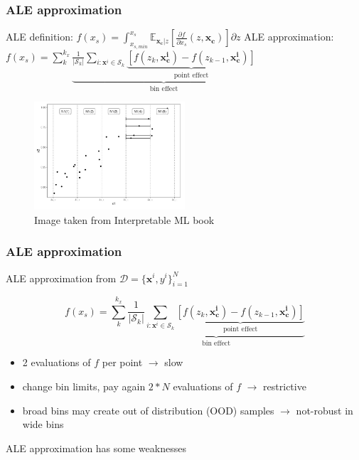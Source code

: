 \documentclass{beamer}
\newcommand{\xb}{\boldsymbol{x}}
\begin{document}
\begin{frame}
  \frametitle{ALE approximation}
  ALE definition: \( f(x_s) = \int_{x_{s, min}}^{x_s}\mathbb{E}_{\bm{x_c}|z}[ \frac{\partial f}{\partial x_s}(z, \bm{x_c})] \partial z \)
  \noindent\makebox[\linewidth]{\rule{\paperwidth}{0.4pt}}
  ALE approximation:
  \(f(x_s) = \sum_k^{k_x} \underbrace{\frac{1}{|\mathcal{S}_k|} \sum_{i:\xb^i \in \mathcal{S}_k} \underbrace{[f(z_k, \bm{x^i_c}) - f(z_{k-1}, \bm{x^i_c})]}_{\text{point effect}}}_{\text{bin effect}}\)

  \begin{figure}[ht]
    \centering
    \includegraphics[width=0.5\textwidth]{./figures/ale_bins_iml.png}
    \caption{Image taken from Interpretable ML book~\citep{molnar2022}}
  \end{figure}
\end{frame}


\begin{frame}
  \frametitle{ALE approximation}
  ALE approximation from \(\mathcal{D} = { \{\bm{x}^i, y^i}\}_{i=1}^N\)

    \[f(x_s) = \sum_k^{k_x} \underbrace{\frac{1}{|\mathcal{S}_k|} \sum_{i:\xb^i \in \mathcal{S}_k} \underbrace{[f(z_k, \bm{x^i_c}) - f(z_{k-1}, \bm{x^i_c})]}_{\text{point effect}}}_{\text{bin effect}} \]

    \begin{itemize}
    \item 2 evaluations of \(f\) per point \( \rightarrow \) slow
    \item change bin limits, pay again \(2*N\) evaluations of \(f\) \( \rightarrow\) restrictive
    \item broad bins may create out of distribution (OOD) samples \( \rightarrow\) not-robust in wide bins
    \end{itemize}

  \noindent\makebox[\linewidth]{\rule{\paperwidth}{0.4pt}}
  ALE approximation has some weaknesses
\end{frame}
\end{document}
